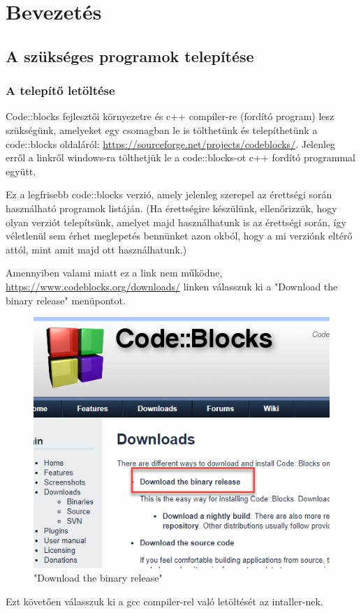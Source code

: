 \chapter{Bevezetés} %
\label{ch:bevezetes}

\section{A szükséges programok telepítése}

\subsection{A telepítő letöltése}
Code::blocks fejlesztői környezetre és c++ compiler-re (fordító program) lesz szükségünk, amelyeket egy csomagban le is tölthetünk és telepíthetünk a code::blocks oldaláról: \url{https://sourceforge.net/projects/codeblocks/}. Jelenleg erről a linkről windows-ra tölthetjük le a code::blocks-ot c++ fordító programmal együtt. 

Ez a legfrisebb code::blocks verzió, amely jelenleg szerepel az érettségi során használható programok listáján. (Ha érettségire készülünk, ellenőrizzük, hogy olyan verziót telepítsünk, amelyet majd használhatunk is az érettségi során, így véletlenül sem érhet meglepetés bennünket azon okból, hogy a mi verziónk eltérő attól, mint amit majd ott használhatunk.)

Amennyiben valami miatt ez a link nem működne, \url{https://www.codeblocks.org/downloads/} linken válasszuk ki a "Download the binary release" menüpontot.

\begin{figure}[H]
	\centering
	\includegraphics[width=0.5\linewidth]{images/bevezetes/choose}
	\caption{"Download the binary release"}
	\label{fig:choose}
\end{figure}

Ezt követően válasszuk ki a gcc compiler-rel való letöltését az intaller-nek.

